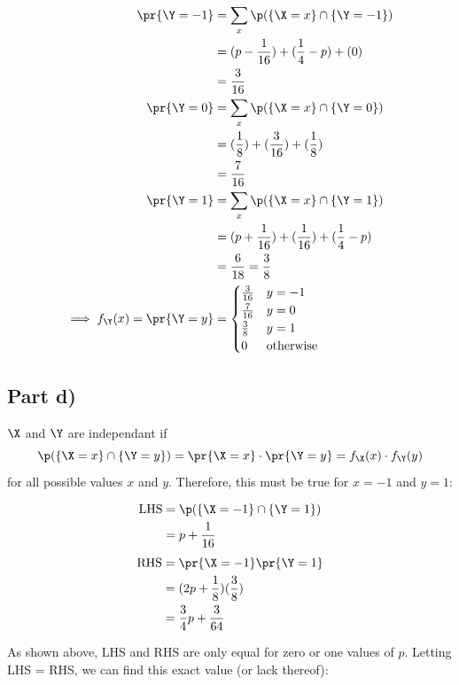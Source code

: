\begin{align*}
\pr{\Y = -1} &= \sum _x \p(\{ \X = x \} \cap \{ \Y = -1 \}) \\
&= (p - \frac{1}{16}) + (\frac{1}{4} - p) + (0) \\
&= \frac{3}{16} \\
\pr{\Y = 0} &= \sum _x \p(\{ \X = x \} \cap \{ \Y = 0 \}) \\
&= (\frac{1}{8}) + (\frac{3}{16}) + (\frac{1}{8}) \\
&= \frac{7}{16} \\
\pr{\Y = 1} &= \sum _x \p(\{ \X = x \} \cap \{ \Y = 1 \}) \\
&= (p + \frac{1}{16}) + (\frac{1}{16}) + (\frac{1}{4} - p) \\
&= \frac{6}{18} = \frac{3}{8} \\
\implies f_{\Y}(x) = \pr{\Y = y} &= \begin{cases}
\frac{3}{16} & y = -1 \\
\frac{7}{16} & y = 0 \\
\frac{3}{8} & y = 1 \\
0 & \text{otherwise}
\end{cases}
\end{align*}

\subsection{Part d)}

$\X$ and $\Y$ are independant if
\begin{equation} \label{th:q1d-independence}
\p(\{ \X = x \} \cap \{ \Y = y \}) = \pr{\X = x} \cdot \pr{\Y = y} = f_\X(x) \cdot f_\Y(y)
\end{equation}
for all possible values $x$ and $y$. Therefore, this must be true for $x = -1$ and $y = 1$:

\begin{multicols}{2}
\begin{align*}
\mathrm{LHS} &= \p(\{ \X = -1 \} \cap \{ \Y = 1 \}) \\
&= p + \frac{1}{16}
\end{align*}
\begin{align*}
\mathrm{RHS} &= \pr{\X = -1}\pr{\Y = 1} \\
&= (2p + \frac{1}{8})(\frac{3}{8}) \\
&= \frac{3}{4}p + \frac{3}{64}
\end{align*}
\end{multicols}

As shown above, LHS and RHS are only equal for zero or one values of $p$. Letting LHS = RHS, we can find this exact value (or lack thereof):

